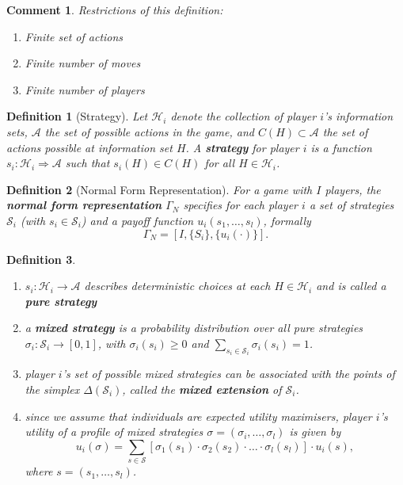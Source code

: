\documentclass[12pt]{extreport} %
\theoremstyle{named}
\theoremstyle{itshape}
\newtheorem*{definition}{Definition}
\theoremstyle{normal}
\newtheorem*{comment*}{Comment}
\begin{document}
\begin{comment*}
	Restrictions of this definition:
	\begin{enumerate}
		\item Finite set of actions
		\item Finite number of moves
		\item Finite number 	of players
	\end{enumerate}
\end{comment*}

\begin{definition}[Strategy]
	Let $\mathcal{H}_i$ denote the collection of player $i$'s information sets, $\mathcal{A}$ the set of possible actions in the game, and $C(H) \subset \mathcal{A}$ the set of actions possible at information set $H$. A \textbf{strategy} for player $i$ is a function $s_i \colon \mathcal{H}_i \Rightarrow \mathcal{A}$ such that $s_i(H) \in C(H)$ for all $H \in \mathcal{H}_i$.
\end{definition} 

\begin{definition}[Normal Form Representation]
	For a game with $I$ players, the \textbf{normal form representation} $\Gamma_N$ specifies for each player $i$ a set of strategies $\mathcal{S}_{i}$ (with $s_i \in \mathcal{S}_i$) and a payoff function $u_i(s_1, \dotsc, s_l)$, formally 
	$$ \Gamma_N = \left[I, \{ S_i \}, \{ u_i(\cdot) \} \right]. $$
\end{definition} 

\begin{definition} ~\
	\begin{enumerate}
		\item $s_i \colon \mathcal{H}_i \rightarrow \mathcal{A}$ describes deterministic choices at each $H \in \mathcal{H}_i$ and is called a \textbf{pure strategy}
		\item a \textbf{mixed strategy} is a probability distribution over all pure strategies $\sigma_i \colon \mathcal{S}_i \rightarrow [0, 1]$, with $\sigma_i(s_i) \geq 0$ and $\sum_{s_i \in \mathcal{S}_i} \sigma_i(s_i) = 1$.
		\item player $i$'s set of possible mixed strategies can be associated with the points of the simplex $\Delta(\mathcal{S}_i)$, called the \textbf{mixed extension} of $\mathcal{S}_i$.
		\item since we assume that individuals are expected utility maximisers, player $i$'s utility of a profile of mixed strategies $\sigma = \left( \sigma_i, \dotsc, \sigma_l \right)$ is given by
			$$ u_i(\sigma) = \sum_{s \in \mathcal{S}} [\sigma_1(s_1) \cdot \sigma_2(s_2) \cdot \dotsc \cdot \sigma_l(s_l)] \cdot u_i(s), $$
			where $s = (s_1, \dotsc, s_l)$.
	\end{enumerate}
\end{definition}
\end{document}
